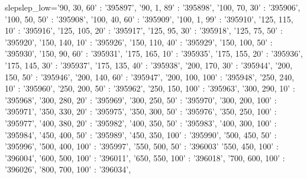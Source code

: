 
slepslep_low={'90, 30, 60' : '395897',
              '90, 1, 89' : '395898',
              '100, 70, 30' : '395906',
              '100, 50, 50' : '395908',
              '100, 40, 60' : '395909',
              '100, 1, 99' : '395910',
              '125, 115, 10' : '395916',
              '125, 105, 20' : '395917',
              '125, 95, 30' : '395918',
              '125, 75, 50' : '395920',
              '150, 140, 10' : '395926',
              '150, 110, 40' : '395929',
              '150, 100, 50' : '395930',
              '150, 90, 60' : '395931',
              '175, 165, 10' : '395935',
              '175, 155, 20' : '395936',
              '175, 145, 30' : '395937',
              '175, 135, 40' : '395938',
              '200, 170, 30' : '395944',
              '200, 150, 50' : '395946',
              '200, 140, 60' : '395947',
              '200, 100, 100' : '395948',
              '250, 240, 10' : '395960',
              '250, 200, 50' : '395962',
              '250, 150, 100' : '395963',
              '300, 290, 10' : '395968',
              '300, 280, 20' : '395969',
              '300, 250, 50' : '395970',
              '300, 200, 100' : '395971',
              '350, 330, 20' : '395975',
              '350, 300, 50' : '395976',
              '350, 250, 100' : '395977',
              '400, 380, 20' : '395982',
              '400, 350, 50' : '395983',
              '400, 300, 100' : '395984',
              '450, 400, 50' : '395989',
              '450, 350, 100' : '395990',
              '500, 450, 50' : '395996',
              '500, 400, 100' : '395997',
              '550, 500, 50' : '396003'
              '550, 450, 100' : '396004',
              '600, 500, 100' : '396011',
              '650, 550, 100' : '396018',
              '700, 600, 100' : '396026',
              '800, 700, 100' : '396034',}
    
    


